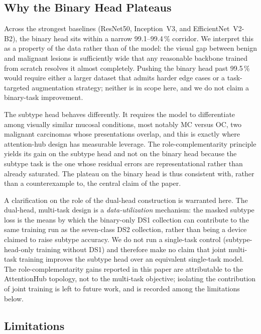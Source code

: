 \subsection{Why the Binary Head Plateaus}\label{subsec:binary_plateau}

Across the strongest baselines (ResNet50, Inception~V3, and
EfficientNet~V2-B2), the binary head sits within a narrow 99.1--99.4\,\%
corridor. We interpret this as a property of the data rather than of the
model: the visual gap between benign and malignant lesions is sufficiently wide
that any reasonable backbone trained from scratch resolves it almost
completely. Pushing the binary head past 99.5\,\% would require either a larger
dataset that admits harder edge cases or a task-targeted augmentation strategy;
neither is in scope here, and we do not claim a binary-task improvement.

The subtype head behaves differently. It requires the model to differentiate
among visually similar mucosal conditions, most notably MC versus OC, two
malignant carcinomas whose presentations overlap, and this is exactly where
attention-hub design has measurable leverage. The role-complementarity
principle yields its gain on the subtype head and not on the binary head
because the subtype task is the one whose residual errors are
representational rather than already saturated. The plateau on the binary head
is thus consistent with, rather than a counterexample to, the central claim of
the paper.

A clarification on the role of the dual-head construction is warranted here.
The dual-head, multi-task design is a \emph{data-utilization} mechanism: the
masked subtype loss is the means by which the binary-only DS1 collection can
contribute to the same training run as the seven-class DS2 collection, rather
than being a device claimed to raise subtype accuracy. We do not run a
single-task control (subtype-head-only training without DS1) and therefore make
no claim that joint multi-task training improves the subtype head over an
equivalent single-task model. The role-complementarity gains reported in this
paper are attributable to the AttentionHub topology, not to the multi-task
objective; isolating the contribution of joint training is left to future work,
and is recorded among the limitations below.

\subsection{Limitations}\label{subsec:limitations}

